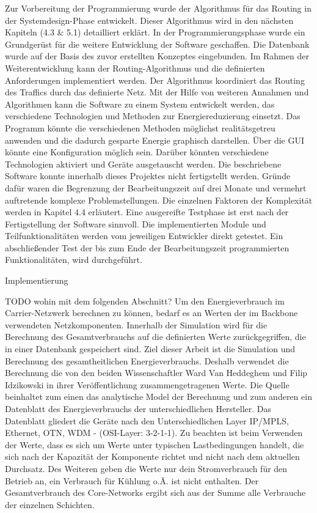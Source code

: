 \documentclass[12pt,titlepage]{article}
\begin{document}
Zur Vorbereitung der Programmierung wurde der Algorithmus für das Routing in der Systemdesign-Phase entwickelt.  Dieser Algorithmus wird in den nächsten Kapiteln (4.3 \& 5.1) detailliert erklärt.
In der Programmierungsphase wurde ein Grundgerüst für die weitere Entwicklung der Software geschaffen. Die Datenbank wurde auf der Basis des zuvor erstellten Konzeptes eingebunden. Im Rahmen der Weiterentwicklung kann der Routing-Algorithmus und die definierten Anforderungen implementiert werden. Der Algorithmus koordiniert das Routing des Traffics durch das definierte Netz. Mit der Hilfe von weiteren Annahmen und Algorithmen kann die Software zu einem System entwickelt werden, das verschiedene Technologien und Methoden zur Energiereduzierung einsetzt. Das Programm könnte die verschiedenen Methoden möglichst realitätsgetreu anwenden und die dadurch gesparte Energie graphisch darstellen. Über die GUI könnte eine Konfiguration möglich sein.  Darüber könnten verschiedene Technologien aktiviert und Geräte ausgetauscht werden. 
Die beschriebene Software konnte innerhalb dieses Projektes nicht fertigstellt werden. Gründe dafür waren die Begrenzung der Bearbeitungszeit auf drei Monate und vermehrt auftretende komplexe Problemstellungen. Die einzelnen Faktoren der Komplexität werden in Kapitel 4.4 erläutert.
Eine ausgereifte Testphase ist erst nach der Fertigstellung der Software sinnvoll. Die implementierten Module und Teilfunktionalitäten werden vom jeweiligen Entwickler direkt getestet. Ein abschließender Test der bis zum Ende der Bearbeitungszeit programmierten Funktionalitäten, wird durchgeführt.


Implementierung

TODO wohin mit dem folgenden Abschnitt?
Um den Energieverbrauch im Carrier-Netzwerk berechnen zu können, bedarf es an Werten der im Backbone verwendeten Netzkomponenten. Innerhalb der Simulation wird für die Berechnung des Gesamtverbrauchs auf die definierten Werte zurückgegriffen, die in einer Datenbank gespeichert sind. Ziel dieser Arbeit ist die Simulation und Berechnung des gesamtheitlichen Energieverbrauchs. Deshalb verwendet die Berechnung die von den beiden Wissenschaftler Ward Van Heddeghem und Filip Idzikowski in ihrer Veröffentlichung \cite{vanhedde} zusammengetragenen Werte. Die Quelle beinhaltet zum einen das analytische Model der Berechnung und zum anderen ein Datenblatt \cite{vanhsheet} des Energieverbrauchs der unterschiedlichen Hersteller. Das Datenblatt gliedert die Geräte nach den Unterschiedlichen Layer IP/MPLS, Ethernet, OTN, WDM - (OSI-Layer: 3-2-1-1). Zu beachten ist beim Verwenden der Werte, dass es sich um Werte unter typischen Lastbedingungen handelt, die sich nach der Kapazität der Komponente richtet und nicht nach dem aktuellen Durchsatz. Des Weiteren geben die Werte nur dein Stromverbrauch für den Betrieb an, ein Verbrauch für Kühlung o.Ä. ist nicht enthalten.
Der Gesamtverbrauch des Core-Networks ergibt sich aus der Summe alle Verbrauche der einzelnen Schichten.
\end{document}
